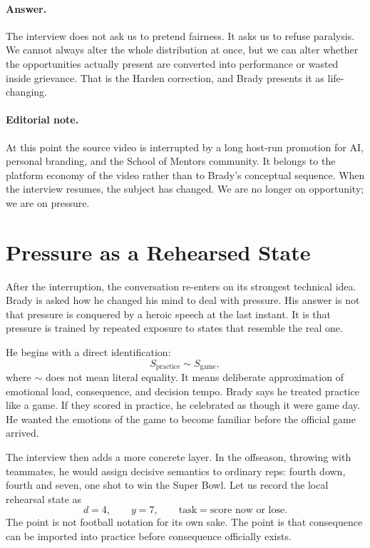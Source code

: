 \paragraph{Answer.} The interview does not ask us to pretend fairness. It asks us to refuse paralysis. We cannot always alter the whole distribution at once, but we can alter whether the opportunities actually present are converted into performance or wasted inside grievance. That is the Harden correction, and Brady presents it as life-changing.

\paragraph{Editorial note.} At this point the source video is interrupted by a long host-run promotion for AI, personal branding, and the School of Mentors community. It belongs to the platform economy of the video rather than to Brady's conceptual sequence. When the interview resumes, the subject has changed. We are no longer on opportunity; we are on pressure.

\section{Pressure as a Rehearsed State}

After the interruption, the conversation re-enters on its strongest technical idea. Brady is asked how he changed his mind to deal with pressure. His answer is not that pressure is conquered by a heroic speech at the last instant. It is that pressure is trained by repeated exposure to states that resemble the real one.

He begins with a direct identification:
\begin{equation}
S_{\text{practice}} \sim S_{\text{game}},
\end{equation}
where \(\sim\) does not mean literal equality. It means deliberate approximation of emotional load, consequence, and decision tempo. Brady says he treated practice like a game. If they scored in practice, he celebrated as though it were game day. He wanted the emotions of the game to become familiar before the official game arrived.

The interview then adds a more concrete layer. In the offseason, throwing with teammates, he would assign decisive semantics to ordinary reps: fourth down, fourth and seven, one shot to win the Super Bowl. Let us record the local rehearsal state as
\begin{equation}
d=4,
\qquad
y=7,
\qquad
\text{task}=\text{score now or lose}.
\end{equation}
The point is not football notation for its own sake. The point is that consequence can be imported into practice before consequence officially exists.

